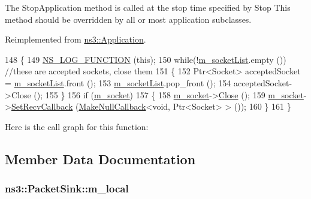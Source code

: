 The Stop\+Application method is called at the stop time specified by Stop This method should be overridden by all or most application subclasses. 

Reimplemented from \hyperlink{classns3_1_1Application_aea844f3c114b1faf8de1faf5127ea8b4}{ns3\+::\+Application}.


\begin{DoxyCode}
148 \{
149   \hyperlink{log-macros-disabled_8h_a90b90d5bad1f39cb1b64923ea94c0761}{NS\_LOG\_FUNCTION} (\textcolor{keyword}{this});
150   \textcolor{keywordflow}{while}(!\hyperlink{classns3_1_1PacketSink_a510c28b6f2397952196b759a237404e9}{m\_socketList}.empty ()) \textcolor{comment}{//these are accepted sockets, close them}
151     \{
152       Ptr<Socket> acceptedSocket = \hyperlink{classns3_1_1PacketSink_a510c28b6f2397952196b759a237404e9}{m\_socketList}.front ();
153       \hyperlink{classns3_1_1PacketSink_a510c28b6f2397952196b759a237404e9}{m\_socketList}.pop\_front ();
154       acceptedSocket->Close ();
155     \}
156   \textcolor{keywordflow}{if} (\hyperlink{classns3_1_1PacketSink_aeb02446587fb10cf429a39dcccb89ed0}{m\_socket}) 
157     \{
158       \hyperlink{classns3_1_1PacketSink_aeb02446587fb10cf429a39dcccb89ed0}{m\_socket}->\hyperlink{classns3_1_1Socket_abdac6e2498c5aa2963ef361d4200ddf3}{Close} ();
159       \hyperlink{classns3_1_1PacketSink_aeb02446587fb10cf429a39dcccb89ed0}{m\_socket}->\hyperlink{classns3_1_1Socket_a243f7835ef1a85f9270fd3577e3a40da}{SetRecvCallback} (\hyperlink{group__makenullcallback_ga7e3cd6816f63ea9112c04b0086c2c65a}{MakeNullCallback}<\textcolor{keywordtype}{void}, Ptr<Socket> 
      > ());
160     \}
161 \}
\end{DoxyCode}


Here is the call graph for this function\+:




\subsection{Member Data Documentation}
\subsubsection[{\texorpdfstring{m\+\_\+local}{m_local}}]{ ns3\+::\+Packet\+Sink\+::m\+\_\+local\hspace{0.3cm}{\ttfamily [private]}}\hypertarget{classns3_1_1PacketSink_a3d7ac204fd89eb95de0247caff3db927}{}\label{classns3_1_1PacketSink_a3d7ac204fd89eb95de0247caff3db927}


